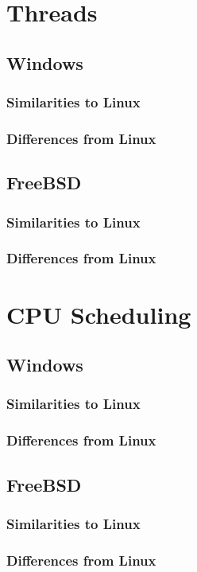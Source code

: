 \documentclass[letterpaper,10pt,titlepage]{article}
\begin{document}
\section{Threads}

\subsection{Windows}

\subsubsection{Similarities to Linux}

\subsubsection{Differences from Linux}

\subsection{FreeBSD}

\subsubsection{Similarities to Linux}

\subsubsection{Differences from Linux}

\section{CPU Scheduling}

\subsection{Windows}

\subsubsection{Similarities to Linux}

\subsubsection{Differences from Linux}

\subsection{FreeBSD}

\subsubsection{Similarities to Linux}

\subsubsection{Differences from Linux}


\newpage
{}

\end{document}
